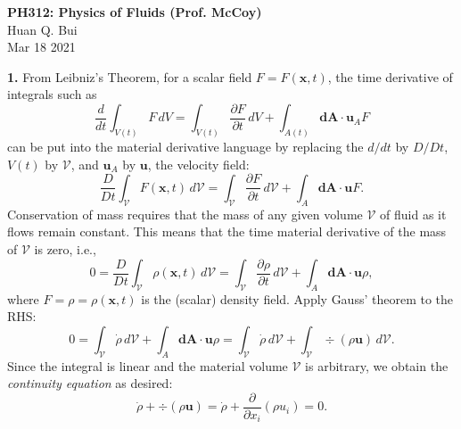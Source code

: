 \documentclass[11pt]{article}
\newcommand{\f}[2]{\frac{#1}{#2}}
\newcommand{\p}{\partial}%
\begin{document}
\begin{center}
{\large \bf PH312: Physics of Fluids (Prof. McCoy)}\\
{ Huan Q. Bui}\\
Mar 18 2021
\end{center}

\noindent \textbf{1.} From Leibniz's Theorem, for a scalar field $F = F(\textbf{x},t)$, the time derivative of integrals such as
\begin{equation*}
\f{d}{dt}\int_{V(t)} F\,dV = \int_{V(t)} \f{\p F}{\p t}\,dV + \int_{A(t)} \mathbf{dA \cdot u}_A F
\end{equation*}
can be put into the material derivative language by replacing the $d/dt$ by $D/Dt$, $V(t)$ by $\mathcal{V}$, and $\mathbf{u}_A$ by $\mathbf{u}$, the velocity field:
\begin{equation*}
\f{D}{Dt}\int_{\mathcal{V}} F(\textbf{x},t)\,d\mathcal{V} = \int_{\mathcal{V}} \f{\p F}{\p t}\,d\mathcal{V} + \int_{A} \mathbf{dA\cdot u} F.
\end{equation*}
Conservation of mass requires that the mass of any given volume $\mathcal{V}$ of fluid as it flows remain constant. This means that the time material derivative of the mass of $\mathcal{V}$ is zero, i.e., 
\begin{equation*}
0 = \f{D}{Dt}\int_{\mathcal{V}} \rho(\textbf{x},t)\,d\mathcal{V} = \int_{\mathcal{V}} \f{\p \rho}{\p t}\,d\mathcal{V} + \int_{A} \mathbf{dA\cdot u} \rho,
\end{equation*}  
where $F = \rho = \rho(\textbf{x},t)$ is the (scalar) density field. Apply Gauss' theorem to the RHS:
\begin{equation*}
0 = \int_{\mathcal{V}}\dot{\rho}\,d\mathcal{V} + \int_A \mathbf{dA \cdot u}\rho = \int_{\mathcal{V}}\dot{\rho}\,d\mathcal{V}  + \int_{\mathcal{V}} \div (\rho \textbf{u}) \,d\mathcal{V}.
\end{equation*}
Since the integral is linear and the material volume $\mathcal{V}$ is arbitrary, we obtain the \textit{continuity equation} as desired:
\begin{equation*}
\dot{\rho} + \div(\rho \mathbf{u}) = \dot{\rho} + \f{\p}{\p x_i}(\rho u_i) = 0.
\end{equation*}
\end{document}
